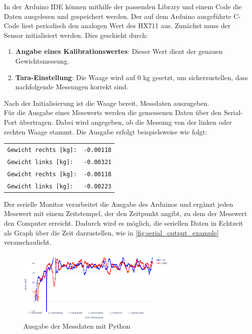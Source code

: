 In der Arduino IDE können mithilfe der passenden Library und einem Code die Daten ausgelesen und gespeichert werden.
Der auf dem Arduino ausgeführte C-Code liest periodisch den analogen Wert des HX711 aus. Zunächst muss der Sensor initialisiert werden. Dies geschieht durch:
\begin{enumerate}
    \item \textbf{Angabe eines Kalibrationswertes}: Dieser Wert dient der genauen Gewichtsmessung.
    \item \textbf{Tara-Einstellung}: Die Waage wird auf 0 kg gesetzt, um sicherzustellen, dass nachfolgende Messungen korrekt sind.
\end{enumerate}
Nach der Initialisierung ist die Waage bereit, Messdaten auszugeben.
\\
Für die Ausgabe eines Messwerts werden die gemessenen Daten über den Serial-Port übertragen.
Dabei wird angegeben, ob die Messung von der linken oder rechten Waage stammt.
Die Ausgabe erfolgt beispielsweise wie folgt:
\begin{center}
    \begin{tabular}{l r}
        \texttt{Gewicht rechts [kg]:} & \texttt{-0.00118} \\
        \texttt{Gewicht links [kg]:}  & \texttt{-0.00321} \\
        \texttt{Gewicht rechts [kg]:} & \texttt{-0.00118} \\
        \texttt{Gewicht links [kg]:}  & \texttt{-0.00223} \\
    \end{tabular}
\end{center}
Der serielle Monitor verarbeitet die Ausgabe des Arduinos und ergänzt jeden Messwert mit einem Zeitstempel, der den Zeitpunkt angibt, zu dem der Messwert den Computer erreicht.
Dadurch wird es möglich, die seriellen Daten in Echtzeit als Graph über die Zeit darzustellen, wie in \autoref{fig:serial_output_example} veranschaulicht.
\begin{figure}[h!]
    \centering
    \includegraphics[width=0.7\textwidth]{img/serial_output_example.png} %
    \caption{Ausgabe der Messdaten mit Python}
    \label{fig:serial_output_example}
\end{figure}
